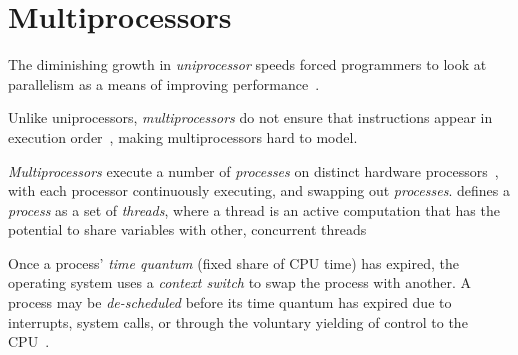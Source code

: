 



\section{Multiprocessors}
The diminishing growth in \emph{uniprocessor} speeds
forced programmers to look at parallelism as a means of improving
performance~\citep{cantrill2008real}. 

Unlike uniprocessors, \emph{multiprocessors} do
not ensure that instructions appear in execution order~\cite{scott2013shared},
making multiprocessors hard to model.


\emph{Multiprocessors} execute a number of \emph{processes} on distinct
hardware processors~\citep[Appendix~B.2]{herlihy2020art}, with each processor
continuously executing, and swapping out \emph{processes}.
\citeauthor{scott2013shared} defines a \emph{process} as a set of
\emph{threads}, where a thread is an active computation that has the potential
to share variables with other, concurrent threads~\citep[p.6]{scott2013shared}

Once a process' \emph{time quantum} (fixed share of CPU time) has expired, the operating system
uses a \emph{context switch} to swap the process with another. A process
may be \emph{de-scheduled} before its time quantum has expired due to interrupts,
system calls, or through the voluntary yielding of control to the CPU~\citep[Section~3.2.3]{osconcepts2021}.

